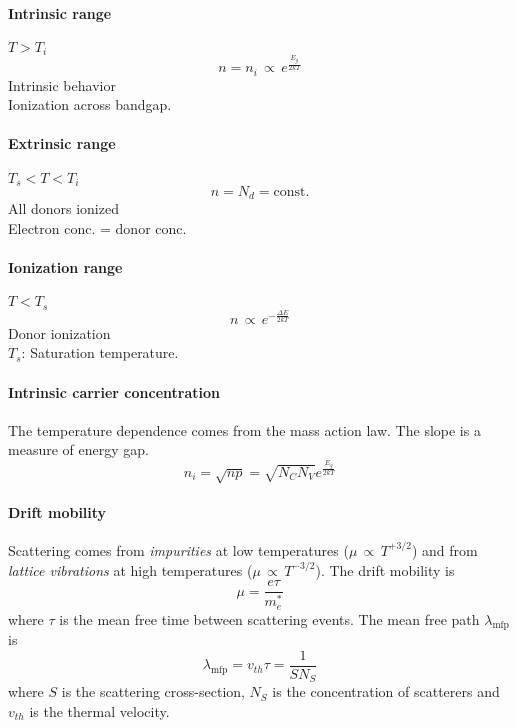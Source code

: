 \begin{multicols}{3}
    \paragraph{Intrinsic range}
    $T > T_i$
    \begin{equation*}
        n = n_i \,\propto\, e^{\frac{E_g}{2kT}}
    \end{equation*}
    Intrinsic behavior \\
    Ionization across bandgap.
\vfill\columnbreak
    \paragraph{Extrinsic range}
    $T_s < T < T_i$
    \begin{equation*}
        n = N_d = \text{const.}
    \end{equation*}
    All donors ionized \\
    Electron conc. = donor conc.
\vfill\columnbreak    
    \paragraph{Ionization range}
    $T < T_s$
    \begin{equation*}
        n \,\propto\, e^{-\frac{\Delta E}{2kT}}
    \end{equation*}
    Donor ionization\\
     $T_s$: Saturation temperature.
\vfill
\end{multicols}


\paragraph{Intrinsic carrier concentration}
The temperature dependence comes from the mass action law.
The slope is a measure of energy gap.
\begin{equation}
    n_i = \sqrt{np} = \sqrt{N_C N_V} e^{\frac{E_g}{2kT}}
\end{equation}

\paragraph{Drift mobility}
Scattering comes from \emph{impurities} at low temperatures 
($\mu \,\propto\, T^{+3/2}$) 
and from \emph{lattice vibrations} at high temperatures 
($\mu \,\propto\, T^{-3/2}$).
The drift mobility is 
\begin{equation}
    \mu = \frac{e \tau}{m_e^*}
\end{equation}
where $\tau$ is the mean free time between scattering events.
The mean free path $\lambda_{\textrm{mfp}}$ is
\begin{equation}
    \lambda_{\textrm{mfp}} = v_{th} \tau = \frac{1}{S N_S}
\end{equation}
where $S$ is the scattering cross-section, $N_S$ is the concentration of scatterers
and $v_{th}$ is the thermal velocity.

